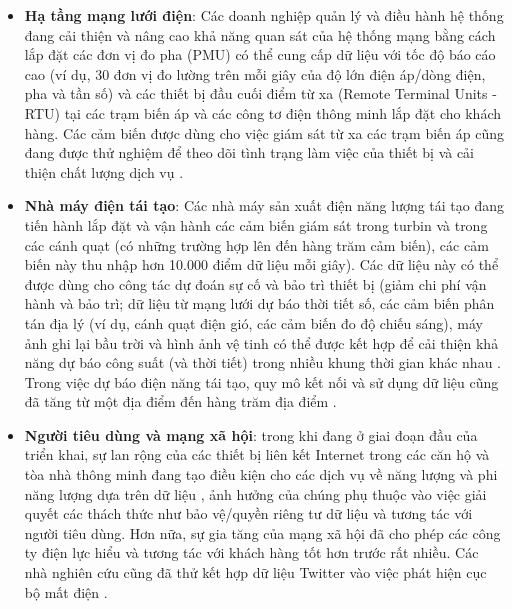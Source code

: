 \documentclass[utf8]{frontiersSCNS} %
\begin{document}
\begin{itemize}
	\item \textbf{Hạ tầng mạng lưới điện}: Các doanh nghiệp quản lý và điều hành hệ thống đang cải thiện và nâng cao khả năng quan sát của hệ thống mạng bằng cách lắp đặt các đơn vị đo pha (PMU) có thể cung cấp dữ liệu với tốc độ báo cáo cao (ví dụ, 30 đơn vị đo lường trên mỗi giây của độ lớn điện áp/dòng điện, pha và tần số) và các thiết bị đầu cuối điểm từ xa (Remote Terminal Units - RTU) tại các trạm biến áp và các công tơ điện thông minh lắp đặt cho khách hàng. Các cảm biến được dùng cho việc giám sát từ xa các trạm biến áp cũng đang được thử nghiệm để theo dõi tình trạng làm việc của thiết bị và cải thiện chất lượng dịch vụ \citep{Leitao2015}.
	
	\item \textbf{Nhà máy điện tái tạo}: Các nhà máy sản xuất điện năng lượng tái tạo đang tiến hành lắp đặt và vận hành các cảm biến giám sát trong turbin và trong các cánh quạt (có những trường hợp lên đến hàng trăm cảm biến), các cảm biến này thu nhập hơn 10.000 điểm dữ liệu mỗi giây). Các dữ liệu này có thể được dùng cho công tác dự đoán sự cố và bảo trì thiết bị (giảm chi phí vận hành và bảo trì; dữ liệu từ mạng lưới dự báo thời tiết số, các cảm biến phân tán địa lý (ví dụ, cánh quạt điện gió, các cảm biến đo độ chiếu sáng), máy ảnh ghi lại bầu trời và hình ảnh vệ tinh có thể được kết hợp để cải thiện khả năng dự báo công suất (và thời tiết) trong nhiều khung thời gian khác nhau \citep{Sweeney2020}. Trong việc dự báo điện năng tái tạo, quy mô kết nối và sử dụng dữ liệu cũng đã tăng từ một địa điểm đến hàng trăm địa điểm \citep{Messner2019}.
	
	\item \textbf{Người tiêu dùng và mạng xã hội}: trong khi đang ở giai đoạn đầu của triển khai, sự lan rộng của các thiết bị liên kết Internet trong các căn hộ và tòa nhà thông minh đang tạo điều kiện cho các dịch vụ về năng lượng và phi năng lượng dựa trên dữ liệu \citep{Ahmed2016}, ảnh hưởng của chúng phụ thuộc vào việc giải quyết các thách thức như bảo vệ/quyền riêng tư dữ liệu và tương tác với người tiêu dùng. Hơn nữa, sự gia tăng của mạng xã hội đã cho phép các công ty điện lực hiểu và tương tác với khách hàng tốt hơn trước rất nhiều\citep{MorenoMunoz2016}. Các nhà nghiên cứu cũng đã thử kết hợp dữ liệu Twitter vào việc phát hiện cục bộ mất điện \citep{Sun2016}.
	

\end{itemize}
\end{document}

